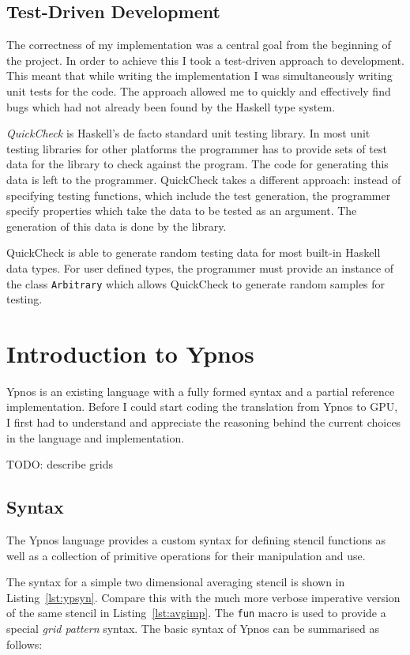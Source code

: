 \documentclass[12pt,a4paper,twoside]{scrbook}
\begin{document}
\subsection{Test-Driven Development}
\label{sec:tdd}

The correctness of my implementation was a central goal from the beginning of
the project. In order to achieve this I took a test-driven approach to
development. This meant that while writing the implementation I was
simultaneously writing unit tests for the code.  The approach allowed me to
quickly and effectively find bugs which had not already been found by the
Haskell type system.

\emph{QuickCheck} is Haskell's de facto standard unit testing library. In most
unit testing libraries for other platforms the programmer has to provide sets of
test data for the library to check against the program.  The code for generating
this data is left to the programmer. QuickCheck takes a different approach:
instead of specifying testing functions, which include the test generation, the
programmer specify properties which take the data to be tested as an
argument. The generation of this data is done by the library.

QuickCheck is able to generate random testing data for most built-in Haskell
data types. For user defined types, the programmer must provide an instance of
the class \texttt{Arbitrary} which allows QuickCheck to generate random samples
for testing.


\section{Introduction to Ypnos}

Ypnos is an existing language with a fully formed syntax and a partial reference
implementation. Before I could start coding the translation from Ypnos to GPU, I
first had to understand and appreciate the reasoning behind the current choices
in the language and implementation.

TODO: describe grids

\subsection{Syntax}

The Ypnos language provides a custom syntax for defining stencil functions as
well as a collection of primitive operations for their manipulation and use.

The syntax for a simple two dimensional averaging stencil is shown in
Listing~\ref{lst:ypsyn}. Compare this with the much more verbose imperative
version of the same stencil in Listing~\ref{lst:avgimp}.  The \texttt{fun} macro
is used to provide a special \emph{grid pattern} syntax. The basic syntax of
Ypnos can be summarised as follows:
\end{document}
